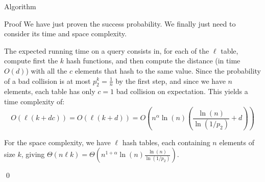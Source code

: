 \documentclass[a4paper]{article}
\begin{document}
\begin{parag}{Algorithm}
\begin{subparag}{Proof}
        We have just proven the success probability. We finally just need to consider its time and space complexity.

        The expected running time on a query consists in, for each of the $\ell$ table, compute first the $k$ hash functions, and then compute the distance (in time $O\left(d\right)$) with all the $c$ elements that hash to the same value. Since the probability of a bad collision is at most $p_2^k = \frac{1}{n}$ by the first step, and since we have $n$ elements, each table has only $c = 1$ bad collision on expectation. This yields a time complexity of: 
        \[O\left(\ell \left(k + dc\right)\right) = O\left(\ell \left(k + d\right)\right) = O\left(n^{\alpha} \ln\left(n\right)\left(\frac{\ln\left(n\right)}{\ln\left(1/p_2\right)} + d\right)\right)\]

        For the space complexity, we have $\ell$ hash tables, each containing $n$ elements of size $k$, giving $\Theta\left(n \ell k\right) = \Theta\left(n^{1 + \alpha} \ln\left(n\right) \frac{\ln\left(n\right)}{\ln\left(1/p_2\right)}\right)$.

        \qed
    \end{subparag}
\end{parag}
\end{document}
